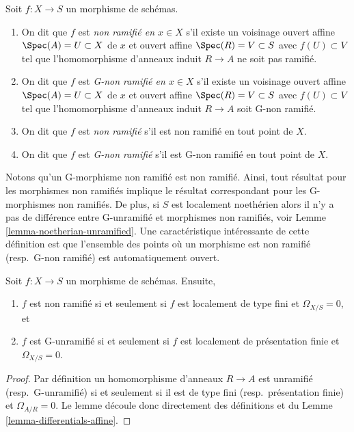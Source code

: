 \begin{definition}
\label{definition-unramified}
Soit $f : X \to S$ un morphisme de schémas.
\begin{enumerate}
\item On dit que $f$ est {\it non ramifié
en $x \in X$} s'il existe un voisinage ouvert affine $\Spec(A) = U \subset X$
de $x$ et ouvert affine $\Spec(R) = V \subset S$ avec $f(U) \subset V$
tel que l'homomorphisme d'anneaux induit $R \to A$
ne soit pas ramifié.
\item On dit que $f$ est {\it G-non ramifié
en $x \in X$} s'il existe un voisinage ouvert affine $\Spec(A) = U \subset X$
de $x$ et ouvert affine $\Spec(R) = V \subset S$ avec
$f(U) \subset V$ tel que l'homomorphisme d'anneaux induit $R \to A$
soit G-non ramifié.
\item On dit que $f$ est {\it non ramifié} s'il est non ramifié
en tout point de $X$.
\item On dit que $f$ est {\it G-non ramifié} s'il est G-non ramifié
en tout point de $X$.
\end{enumerate}
\end{definition}

\noindent
Notons qu'un G-morphisme non ramifié est non ramifié. Ainsi, tout résultat pour
les morphismes non ramifiés implique le résultat correspondant pour les G-morphismes
non ramifiés. De plus, si $S$ est localement noethérien alors il n'y a pas
de différence entre G-unramifié et morphismes non ramifiés,
voir Lemme \ref{lemma-noetherian-unramified}. Une caractéristique
intéressante de cette définition est que l'ensemble des points où un morphisme
est non ramifié (resp.\ G-non ramifié) est automatiquement ouvert.

\begin{lemma}
\label{lemma-unramified-omega-zero}
Soit $f : X \to S$ un morphisme de schémas. Ensuite,
\begin{enumerate}
\item $f$ est non ramifié si et seulement si $f$ est localement de
type fini et $\Omega_{X/S} = 0$, et
\item $f$ est G-unramifié si et seulement si $f$ est localement de présentation
finie et $\Omega_{X/S} = 0$.
\end{enumerate}
\end{lemma}

\begin{proof}
Par définition un homomorphisme d'anneaux $R \to A$ est unramifié (resp.\ G-unramifié)
si et seulement si il est de type fini (resp.\ présentation
finie) et $\Omega_{A/R} = 0$.
Le lemme découle donc directement des définitions et du Lemme \ref{lemma-differentials-affine}.
\end{proof}

